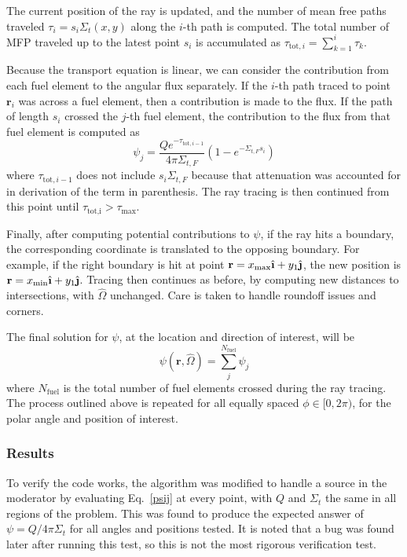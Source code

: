 \documentclass[12pt]{article}
\newcommand{\ihat}{\ensuremath{\hat{\textbf{\i}}}}
\newcommand{\jhat}{\ensuremath{\hat{\textbf{\j}}}}
\newenvironment{solution}[1][Solution]{\begin{trivlist}
\item[\hskip \labelsep {\bfseries #1} {\hspace{-0.2em}\bfseries:}]\hspace{0.3in}\newline}{\end{trivlist}}
\begin{document}
\begin{solution}
The current position of the ray is updated, and the number of mean free paths
traveled $\tau_i=s_i\Sigma_{t}(x,y)$ along the $i$-th path is computed. The total number of MFP
traveled up to the latest point $s_i$ is accumulated as
$\tau_{\text{tot},i}=\sum_{k=1}^i \tau_k$. 

Because the transport equation is linear, we can consider the
contribution from each fuel element to the angular flux separately. If the $i$-th path
traced to point $\mathbf{r}_i$ was across a fuel element, then a contribution is made
to the flux.  If the path of length $s_i$ crossed the $j$-th fuel element, the contribution to the flux from that fuel element is
computed as
\begin{equation}\label{psij}
    \psi_j =
    \frac{Qe^{-\tau_{\text{tot},i-1}}}{4\pi\Sigma_{t,F}}\left(1-e^{-\Sigma_{t,F}s_i}\right)
\end{equation}
where $\tau_{\text{tot},i-1}$ does not include $s_i\Sigma_{t,F}$ because
that attenuation was accounted for in derivation of the term in parenthesis. The
ray tracing is then continued from this point until $\tau_{\text{tot,i}} >
\tau_{\max}$. 

Finally, after computing potential contributions to $\psi$, if the ray hits a boundary, the corresponding coordinate is
translated to the opposing boundary.  For example, if the right boundary is hit at
point $\mathbf{r}=x_{\max}\ihat+y_1\jhat$, the new position is $\mathbf{r} =
x_{\min}\ihat + y_1\jhat$. Tracing then continues as before, by computing new
distances to intersections, with $\hat{\Omega}$ unchanged.  Care is taken to handle roundoff issues and corners.  

The final solution for $\psi$, at
the location and direction of interest, will be 
\begin{equation}
    \psi(\mathbf{r},\hat{\Omega}) = \sum_{j}^{N_{\text{fuel}}} \psi_j
\end{equation}
where $N_{\text{fuel}}$ is the total number of fuel elements crossed during the ray
tracing.  The process outlined above is repeated for all equally spaced
$\phi\in[0,2\pi)$, for the polar angle and position of interest.

\clearpage
\subsubsection*{Results}

To verify the code works, the algorithm was modified to handle a source in the
moderator by evaluating Eq.~\eqref{psij} at every point, with $Q$ and $\Sigma_t$ the
same in all regions of the problem.  This was found to produce the expected answer of
$\psi = Q/4\pi\Sigma_t$ for all angles and positions tested.  It is noted that a
bug was found later after running this test, so this is not the most rigorous
verification test. 


\end{solution}
\end{document}
